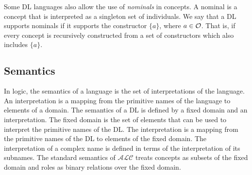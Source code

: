 Some DL languages also allow the use of \emph{nominals} in concepts.
A nominal is a concept that is interpreted as a singleton set of individuals.
We say that a DL supports nominals if it supports the constructor $\{a\}$, where $a \in \mathcal{O}$.
That is, if every concept is recursively constructed from a set of constructors which also includes $\{a\}$.

\subsection{Semantics}
\label{dl_syntax_semantics:subsection:dl_semantics}

In logic, the semantics of a language is the set of interpretations of the language.
An interpretation is a mapping from the primitive names of the language to elements of a domain.
The semantics of a DL is defined by a fixed domain and an interpretation.
The fixed domain is the set of elements that can be used to interpret the primitive names of the DL.
The interpretation is a mapping from the primitive names of the DL to elements of the fixed domain.
The interpretation of a complex name is defined in terms of the interpretation of its subnames.
The standard semantics of $\mathcal{ALC}$ treats concepts as subsets of the fixed domain and roles as binary relations over the fixed domain.

